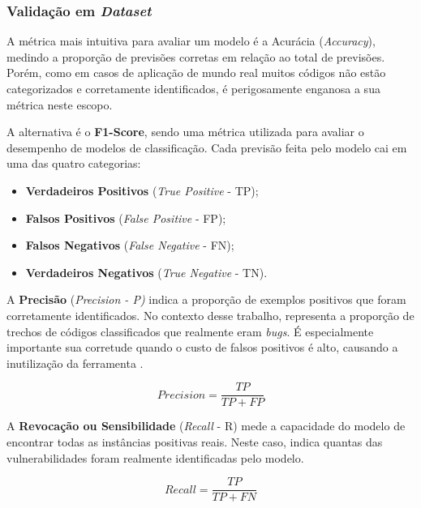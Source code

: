 \documentclass[
    12pt,                %
    openright,           %
    oneside,             %
    a4paper,             %
    english,             %
    brazil               %
]{abntex2}
\begin{document}
\subsubsection{Validação em \textit{Dataset}}
\label{sec:validadedataset}
\par
A métrica mais intuitiva para avaliar um modelo é a Acurácia (\textit{Accuracy}), medindo a proporção de previsões corretas em relação ao total de previsões.
Porém, como em casos de aplicação de mundo real muitos códigos não estão categorizados e corretamente identificados, é perigosamente enganosa a sua métrica neste escopo.
\par
A alternativa é o \textbf{F1-Score}, sendo uma métrica utilizada para avaliar o desempenho de modelos de classificação.
Cada previsão feita pelo modelo cai em uma das quatro categorias:

\begin{itemize}
  \item \textbf{Verdadeiros Positivos} (\textit{True Positive} - TP);
  \item \textbf{Falsos Positivos} (\textit{False Positive} - FP);
  \item \textbf{Falsos Negativos} (\textit{False Negative} - FN);
  \item \textbf{Verdadeiros Negativos} (\textit{True Negative} - TN).
\end{itemize}
\par
A \textbf{Precisão} (\textit{Precision - P)} indica a proporção de exemplos positivos que foram corretamente identificados.
No contexto desse trabalho, representa a proporção de trechos de códigos classificados que realmente eram \textit{bugs}.
É especialmente importante sua corretude quando o custo de falsos positivos é alto, causando a inutilização da ferramenta \cite{aho2007compilers}.

\begin{equation}
  \textit{Precision} = \frac{TP}{TP + FP}
\end{equation}

\vspace{\onelineskip}
\par
A \textbf{Revocação ou Sensibilidade} (\textit{Recall} - R) mede a capacidade do modelo de encontrar todas as instâncias positivas reais.
Neste caso, indica quantas das vulnerabilidades foram realmente identificadas pelo modelo.

\begin{equation}
  \textit{Recall} = \frac{TP}{TP + FN}
\end{equation}
\end{document}
